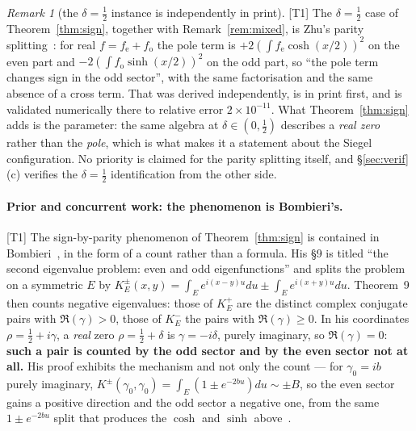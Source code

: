 \documentclass[11pt,a4paper]{article}
\theoremstyle{remark}
\newtheorem{remark}[theorem]{Remark}
\newcommand{\tier}[1]{{\small\textsf{[#1]}}}
\begin{document}
\begin{remark}[the $\delta=\tfrac12$ instance is independently in print]\label{rem:zhu61}
\tier{T1} The $\delta=\tfrac12$ case of Theorem~\ref{thm:sign}, together with
Remark~\ref{rem:mixed}, is Zhu's parity splitting~\cite[Lem.~6.1]{Zhu}: for real
$f=f_{\mathrm{e}}+f_{\mathrm{o}}$ the pole term is
$+2(\int f_{\mathrm{e}}\cosh(x/2))^2$ on the even part and
$-2(\int f_{\mathrm{o}}\sinh(x/2))^2$ on the odd part, so ``the pole term changes sign in the
odd sector'', with the same factorisation and the same absence of a cross term. That was
derived independently, is in print first, and is validated numerically there to relative
error $2\times10^{-11}$. What Theorem~\ref{thm:sign} adds is the parameter: the same algebra
at $\delta\in(0,\tfrac12)$ describes a \emph{real zero} rather than the \emph{pole}, which is
what makes it a statement about the Siegel configuration. No priority is claimed for the
parity splitting itself, and \S\ref{sec:verif}(c) verifies the $\delta=\tfrac12$
identification from the other side.
\end{remark}

\paragraph{Prior and concurrent work: the phenomenon is Bombieri's.}
\tier{T1} The sign-by-parity phenomenon of Theorem~\ref{thm:sign} is contained in
Bombieri~\cite[\S9, Thm.~9, p.~217]{Bombieri}, in the form of a count rather than a formula.
His \S9 is titled ``the second eigenvalue problem: even and odd eigenfunctions'' and splits
the problem on a symmetric $E$ by $K_E^\pm(x,y)=\int_Ee^{i(x-y)u}du\pm\int_Ee^{i(x+y)u}du$.
Theorem~9 then counts negative eigenvalues: those of $K_E^+$ are the distinct complex
conjugate pairs with $\Re(\gamma)>0$, those of $K_E^-$ the pairs with $\Re(\gamma)\ge0$. In
his coordinates $\rho=\tfrac12+i\gamma$, a \emph{real} zero $\rho=\tfrac12+\delta$ is
$\gamma=-i\delta$, purely imaginary, so $\Re(\gamma)=0$: \textbf{such a pair is counted by
the odd sector and by the even sector not at all.} His proof exhibits the mechanism and not
only the count --- for $\gamma_0=ib$ purely imaginary,
$K^\pm(\gamma_0,\gamma_0)=\int_E(1\pm e^{-2bu})du\sim\pm B$, so the even sector gains a
positive direction and the odd sector a negative one, from the same $1\pm e^{-2bu}$ split
that produces the $\cosh$ and $\sinh$ above~\cite[p.~218]{Bombieri}.
\end{document}
